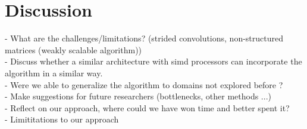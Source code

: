\chapter{Discussion}
- What are the challenges/limitations? (strided convolutions, non-structured matrices (weakly scalable algorithm))\\
- Discuss whether a similar architecture with simd processors can incorporate the algorithm in a similar way. \\ 
- Were we able to generalize the algorithm to domains not explored before ?  \\ 
- Make suggestions for future researchers (bottlenecks, other methods ...) \\
- Reflect on our approach, where could we have won time and better spent it? \\ 
- Limititations to our approach